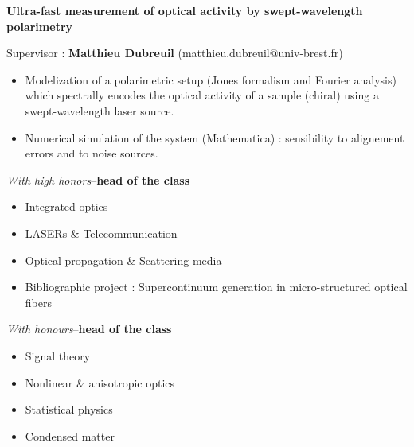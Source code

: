\documentclass[9pt,a4paper,academicons]{altacv}
\begin{document}

\textbf{Ultra-fast measurement of optical activity by swept-wavelength polarimetry}\smallskip



Supervisor : \textbf{Matthieu Dubreuil} (matthieu.dubreuil@univ-brest.fr)
\smallskip
\small{
  \begin{itemize}
    \item Modelization of a polarimetric setup (Jones formalism and Fourier analysis) which spectrally encodes the optical activity of a sample (chiral) using a swept-wavelength laser source.
    \item Numerical simulation of the system (Mathematica) : sensibility to alignement errors and to noise sources.
  \end{itemize}
}





\hfill \textit{With high honors}--\textbf{head of the class}
\vspace{-1em}\small{

  \begin{itemize}
    \item Integrated optics
    \item LASERs \& Telecommunication
    \item Optical propagation  \& Scattering media
    \item Bibliographic project : Supercontinuum generation in micro-structured optical fibers
  \end{itemize}
}

\divider

\hfill\textit{With honours}--\textbf{head of the class}
\vspace{-1em}\small{
  \begin{itemize}
    \item Signal theory
    \item Nonlinear \& anisotropic optics
    \item Statistical physics
    \item Condensed matter
  \end{itemize}
}
\divider
\end{document}
